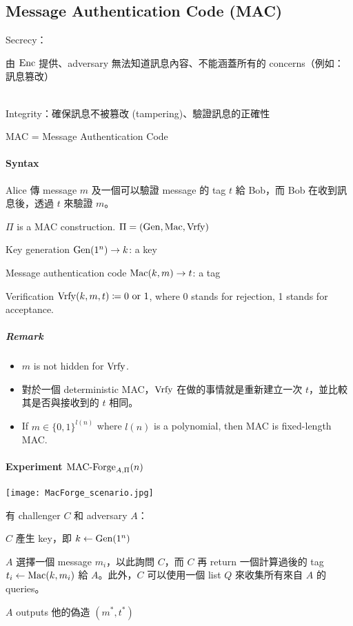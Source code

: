 \subsection{Message Authentication Code (MAC)}


Secrecy：\parbox{\linewidth}{由 \(\operatorname{Enc}\) 提供、adversary 無法知道訊息內容、不能涵蓋所有的 concerns（例如：訊息篡改）} \\
Integrity：確保訊息不被篡改 (tampering)、驗證訊息的正確性

MAC = Message Authentication Code


\paragraph{Syntax}

Alice 傳 message \(m\) 及一個可以驗證 message 的 tag \(t\) 給 Bob，而 Bob 在收到訊息後，透過 \(t\) 來驗證 \(m\)。

\(\Pi\) is a MAC construction.
\(\Pi = (\operatorname{Gen}, \operatorname{\mathrm{Mac}}, \operatorname{\mathrm{Vrfy}})\)
\begin{myItemize}
	\item Key generation \(\operatorname{Gen}(1^n) \rightarrow k\): a key
	\item Message authentication code \(\operatorname{\mathrm{Mac}}(k, m) \rightarrow t\): a tag
	\item Verification \(\operatorname{\mathrm{Vrfy}}(k, m, t) \coloneq 0 \text{ or } 1\), where 0 stands for rejection, 1 stands for acceptance.
\end{myItemize}

\subparagraph{Remark}
\begin{itemize}
	\item \(m\) is not hidden for \(\operatorname{\mathrm{Vrfy}}\).
	\item 對於一個 deterministic MAC，\(\operatorname{\mathrm{Vrfy}}\) 在做的事情就是重新建立一次 \(t\)，並比較其是否與接收到的 \(t\) 相同。
	\item If \(m \in \{0, 1\}^{l(n)}\) where \(l(n)\) is a polynomial, then MAC is fixed-length MAC.
\end{itemize}


\paragraph{Experiment \quad \(\displaystyle \operatorname{\mathrm{MAC-Forge}}_{A, \Pi}(n)\)}

\texttt{[image: MacForge\_scenario.jpg]}

有 challenger \(C\) 和 adversary \(A\)：
\begin{steps}
	\item \(C\) 產生 key，即 \(k \leftarrow \operatorname{Gen}(1^n)\)
	\item \(A\) 選擇一個 message \(m_i\)，以此詢問 \(C\)，而 \(C\) 再 return 一個計算過後的 tag \(t_i \leftarrow \operatorname{\mathrm{Mac}}(k, m_i)\) 給 \(A\)。此外，\(C\) 可以使用一個 list \(Q\) 來收集所有來自 \(A\) 的 queries。
	\item \(A\) outputs 他的偽造 \((m^\ast, t^\ast)\)
\end{steps}

